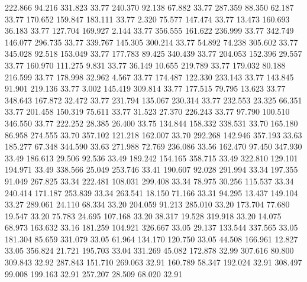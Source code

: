  222.866   94.216  331.823        33.77
 240.370   92.138   67.882        33.77
 287.359   88.350   62.187        33.77
 170.652  159.847  183.111        33.77
   2.320   75.577  147.474        33.77
  13.473  160.693   36.183        33.77
 127.704  169.927    2.144        33.77
 356.555  161.622  236.999        33.77
 342.749  146.077  296.735        33.77
 339.767  145.305  300.214        33.77
  54.892   74.238  305.602        33.77
 345.028   92.518  153.049        33.77
 177.783   89.425  340.439        33.77
 204.053  152.396   29.557        33.77
 160.970  111.275    9.831        33.77
  36.149   10.655  219.789        33.77
 179.032   80.188  216.599        33.77
 178.998   32.962    4.567        33.77
 174.487  122.330  233.143        33.77
 143.845   91.901  219.136        33.77
   3.002  145.419  309.814        33.77
 177.515   79.795   13.623        33.77
 348.643  167.872   32.472        33.77
 231.794  135.067  230.314        33.77
 232.553   23.325   66.351        33.77
 201.458  150.319   75.611        33.77
  31.523   27.370  226.243        33.77
  97.790  100.510  346.550        33.77
 222.252   28.385   26.400        33.75
 134.844  158.332  338.531        33.70
 165.180   86.958  274.555        33.70
 357.102  121.218  162.007        33.70
 292.268  142.946  357.193        33.63
 185.277   67.348  344.590        33.63
 271.988   72.769  236.086        33.56
 162.470   97.450  347.930        33.49
 186.613   29.506   92.536        33.49
 189.242  154.165  358.715        33.49
 322.810  129.101  194.971        33.49
 338.566   25.049  253.746        33.41
 190.607   92.028  291.994        33.34
 197.355   91.049  267.825        33.34
 222.481  108.031  299.408        33.34
  78.975   30.256  115.537        33.34
 240.414  171.187  253.839        33.34
 263.541   18.150   71.166        33.31
  94.295   13.437  149.104        33.27
 289.061   24.110   68.334        33.20
 204.059   91.213  285.010        33.20
 173.704   77.680   19.547        33.20
  75.783   24.695  107.168        33.20
  38.317   19.528  319.918        33.20
  14.075   68.973  163.632        33.16
 181.259  104.921  326.667        33.05
  29.137  133.544  337.565        33.05
 181.304   85.659  331.079        33.05
  61.964  134.170  120.750        33.05
  44.508  166.961   12.827        33.05
 356.824   21.721  195.703        33.04
 331.269   45.082  172.878        32.99
 307.616   80.800  309.843        32.92
 287.843  151.710  269.063        32.91
 160.789   58.347  192.024        32.91
 308.497   99.008  199.163        32.91
 257.207   28.509   68.020        32.91

